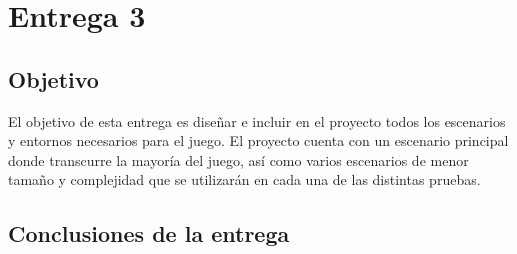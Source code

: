 \section{Entrega 3}


\subsection{Objetivo}


El objetivo de esta entrega es diseñar e incluir en el proyecto todos los escenarios y entornos necesarios para el juego. El proyecto cuenta con un escenario principal donde transcurre la mayoría del juego, así como varios escenarios de menor tamaño y complejidad que se utilizarán en cada una de las distintas pruebas.












\subsection{Conclusiones de la entrega}


